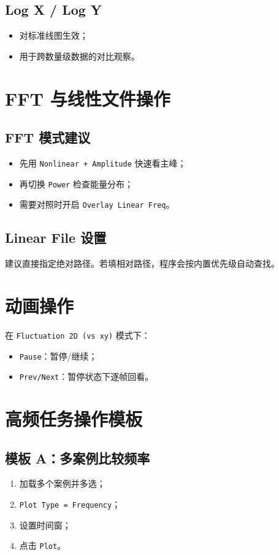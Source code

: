 \documentclass[11pt,a4paper]{ctexart}
\begin{document}
\subsection{Log X / Log Y}
\begin{itemize}
  \item 对标准线图生效；
  \item 用于跨数量级数据的对比观察。
\end{itemize}

\section{FFT 与线性文件操作}
\subsection{FFT 模式建议}
\begin{itemize}
  \item 先用 \texttt{Nonlinear + Amplitude} 快速看主峰；
  \item 再切换 \texttt{Power} 检查能量分布；
  \item 需要对照时开启 \texttt{Overlay Linear Freq}。
\end{itemize}

\subsection{Linear File 设置}
建议直接指定绝对路径。若填相对路径，程序会按内置优先级自动查找。

\section{动画操作}
在 \texttt{Fluctuation 2D (vs xy)} 模式下：
\begin{itemize}
  \item \texttt{Pause}：暂停/继续；
  \item \texttt{Prev/Next}：暂停状态下逐帧回看。
\end{itemize}

\section{高频任务操作模板}
\subsection{模板 A：多案例比较频率}
\begin{enumerate}
  \item 加载多个案例并多选；
  \item \texttt{Plot Type = Frequency}；
  \item 设置时间窗；
  \item 点击 \texttt{Plot}。
\end{enumerate}
\end{document}
